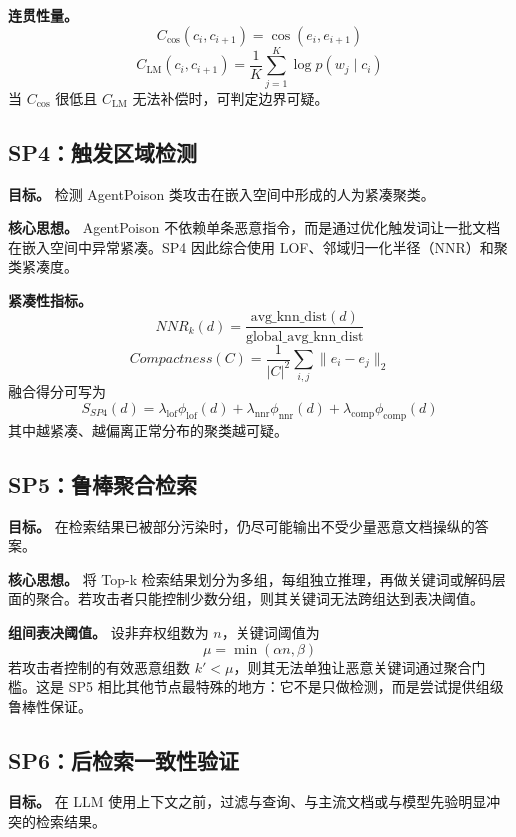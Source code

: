 \documentclass[11pt,a4paper]{ctexart}
\begin{document}
\textbf{连贯性量。}
\begin{equation}
C_{\cos}(c_i,c_{i+1})=\cos(e_i,e_{i+1})
\end{equation}
\begin{equation}
C_{\text{LM}}(c_i,c_{i+1})=
\frac{1}{K}\sum_{j=1}^{K}\log p(w_j \mid c_i)
\end{equation}
当 $C_{\cos}$ 很低且 $C_{\text{LM}}$ 无法补偿时，可判定边界可疑。

\subsection{SP4：触发区域检测}
\textbf{目标。} 检测 AgentPoison 类攻击在嵌入空间中形成的人为紧凑聚类。

\textbf{核心思想。} AgentPoison 不依赖单条恶意指令，而是通过优化触发词让一批文档在嵌入空间中异常紧凑。SP4 因此综合使用 LOF、邻域归一化半径（NNR）和聚类紧凑度。

\textbf{紧凑性指标。}
\begin{equation}
NNR_k(d)=\frac{\text{avg\_knn\_dist}(d)}{\text{global\_avg\_knn\_dist}}
\end{equation}
\begin{equation}
Compactness(C)=\frac{1}{|C|^2}\sum_{i,j}\lVert e_i-e_j\rVert_2
\end{equation}
融合得分可写为
\begin{equation}
S_{SP4}(d)=\lambda_{\text{lof}}\phi_{\text{lof}}(d)+
\lambda_{\text{nnr}}\phi_{\text{nnr}}(d)+
\lambda_{\text{comp}}\phi_{\text{comp}}(d)
\end{equation}
其中越紧凑、越偏离正常分布的聚类越可疑。

\subsection{SP5：鲁棒聚合检索}
\textbf{目标。} 在检索结果已被部分污染时，仍尽可能输出不受少量恶意文档操纵的答案。

\textbf{核心思想。} 将 Top-k 检索结果划分为多组，每组独立推理，再做关键词或解码层面的聚合。若攻击者只能控制少数分组，则其关键词无法跨组达到表决阈值。

\textbf{组间表决阈值。} 设非弃权组数为 $n$，关键词阈值为
\begin{equation}
\mu=\min(\alpha n,\beta)
\end{equation}
若攻击者控制的有效恶意组数 $k' < \mu$，则其无法单独让恶意关键词通过聚合门槛。这是 SP5 相比其他节点最特殊的地方：它不是只做检测，而是尝试提供组级鲁棒性保证。

\subsection{SP6：后检索一致性验证}
\textbf{目标。} 在 LLM 使用上下文之前，过滤与查询、与主流文档或与模型先验明显冲突的检索结果。
\end{document}
